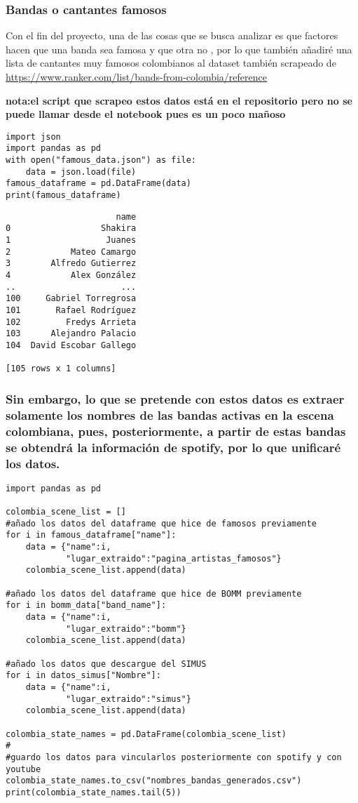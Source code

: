 \documentclass[11pt]{article}
\begin{document}
\subsubsection{Bandas o cantantes famosos}
\label{sec:org18bd128}
Con el fin del proyecto, una de las cosas que se busca analizar es que factores hacen que una banda sea famosa y que otra no , por lo que también añadiré una lista de cantantes muy famosos colombianos al dataset también scrapeado de \url{https://www.ranker.com/list/bands-from-colombia/reference}

\textbf{nota:el script que scrapeo estos datos está en el repositorio pero no se puede llamar desde el notebook pues es un poco mañoso}

\begin{verbatim}
import json
import pandas as pd
with open("famous_data.json") as file:
    data = json.load(file)
famous_dataframe = pd.DataFrame(data)
print(famous_dataframe)
\end{verbatim}

\begin{verbatim}
                      name
0                  Shakira
1                   Juanes
2            Mateo Camargo
3        Alfredo Gutierrez
4            Alex González
..                     ...
100     Gabriel Torregrosa
101       Rafael Rodríguez
102         Fredys Arrieta
103      Alejandro Palacio
104  David Escobar Gallego

[105 rows x 1 columns]
\end{verbatim}

\subsubsection{Sin embargo, lo que se pretende con estos datos es extraer solamente los nombres de las bandas activas en la escena colombiana, pues, posteriormente, a partir de estas bandas se obtendrá la información de spotify, por lo que unificaré los datos.}
\label{sec:orgc09805d}

\begin{verbatim}
import pandas as pd

colombia_scene_list = []
#añado los datos del dataframe que hice de famosos previamente
for i in famous_dataframe["name"]:
    data = {"name":i,
            "lugar_extraido":"pagina_artistas_famosos"}
    colombia_scene_list.append(data)

#añado los datos del dataframe que hice de BOMM previamente
for i in bomm_data["band_name"]:
    data = {"name":i,
            "lugar_extraido":"bomm"}
    colombia_scene_list.append(data)

#añado los datos que descargue del SIMUS
for i in datos_simus["Nombre"]:
    data = {"name":i,
            "lugar_extraido":"simus"}
    colombia_scene_list.append(data)

colombia_state_names = pd.DataFrame(colombia_scene_list)
#
#guardo los datos para vincularlos posteriormente con spotify y con youtube
colombia_state_names.to_csv("nombres_bandas_generados.csv")
print(colombia_state_names.tail(5))
\end{verbatim}
\end{document}
